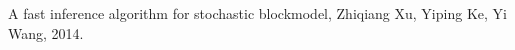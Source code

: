 \documentclass[11pt,a4paper]{extarticle}
\begin{document}

\renewcommand{\refname}{References}
\begin{thebibliography}{9}
    A fast inference algorithm for stochastic blockmodel, Zhiqiang Xu, Yiping Ke, Yi Wang, 2014. \\
\end{thebibliography}
\end{document}
